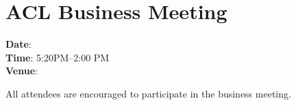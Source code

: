 \section[ACL Business Meeting]{ACL Business Meeting}
\thispagestyle{emptyheader}

\textbf{Date}: \daydateyear \\
\textbf{Time}: 5:20PM--2:00 PM \\
\textbf{Venue}: \BusinessMeetingLoc


All attendees are encouraged to participate in the business
meeting. 

